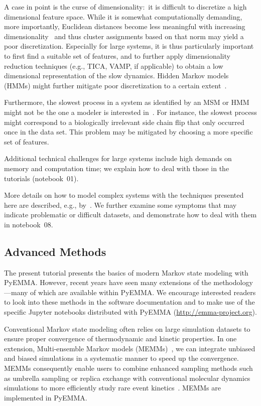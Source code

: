 \documentclass[9pt,tutorial]{livecoms}
\begin{document}
A case in point is the curse of dimensionality:~it is difficult to discretize a high dimensional feature space.
While it is somewhat computationally demanding, more importantly,
Euclidean distances become less meaningful with increasing dimensionality~\cite{aggarwal_surprising_2001}
and thus cluster assignments based on that norm may yield a poor discretization.
Especially for large systems, it is thus particularly important to first find a suitable set of features,
and to further apply dimensionality reduction techniques (e.g., TICA, VAMP, if applicable)
to obtain a low dimensional representation of the slow dynamics.
Hidden Markov models (HMMs) might further mitigate poor discretization to a certain extent~\cite{noe-proj-hid-msm}.

Furthermore, the slowest process in a system as identified by an MSM or HMM might not be the one a modeler is interested in~\cite{banushkina_nonparametric_2015}.
For instance, the slowest process might correspond to a biologically irrelevant side chain flip that only occurred once in the data set.
This problem may be mitigated by choosing a more specific set of features.

Additional technical challenges for large systems include high demands on memory and computation time;
we explain how to deal with those in the tutorials (notebook~01).

More details on how to model complex systems with the techniques presented here are described, e.g., by~\cite{plattner_protein_2015,plattner_complete_2017}.
We further examine some symptoms that may indicate problematic or difficult datasets, and demonstrate how to deal with them in notebook~08.

\subsection{Advanced Methods}

The present tutorial presents the basics of modern Markov state modeling with PyEMMA. 
However, recent years have seen many extensions of the methodology---many of which are available within PyEMMA. 
We encourage interested readers to look into these methods in the software documentation
and to make use of the specific Jupyter notebooks distributed with PyEMMA (\url{http://emma-project.org}).

Conventional Markov state modeling often relies on large simulation datasets to ensure proper convergence of thermodynamic and kinetic properties. 
In one extension, Multi-ensemble Markov models (MEMMs)~\cite{dtram,tram},
we can integrate unbiased and biased simulations in a systematic manner to speed up the convergence. 
MEMMs consequently enable users to combine enhanced sampling methods such as umbrella sampling or replica exchange
with conventional molecular dynamics simulations to more efficiently study rare event kinetics~\cite{trammbar}. 
MEMMs are implemented in PyEMMA.
\end{document}
